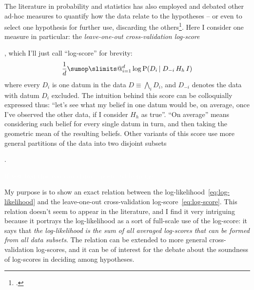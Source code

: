 \documentclass[\ifafour a4paper,12pt,\else a5paper,10pt,\fi%
onecolumn,oneside,article,%
british%
]{memoir}
\makeatletter
\theoremstyle{remark}
\theoremstyle{innote}
\def\sum{\DOTSI\sumop\slimits@}
\newcommand*{\citep}{\footcites}
\newcommand*{\Land}{\bigwedge}
\newcommand*{\p}{\mathrm{P}}%
\renewcommand*{\|}[1][]{\nonscript\,#1\vert\nonscript\;\mathopen{}}
\newcommand*{\sects}{\S\S}%
\newcommand*{\eqn}{eq.}%
\newcommand*{\yK}{I}
\makeatother
\begin{document}
\bigskip

The literature in probability and statistics has also employed and debated
other ad-hoc measures to quantify how the data relate to the hypotheses --
or even to select one hypothesis for further use, discarding the
others\citep[\sects~3.4, 6.1.6 gives the clearest motivation and
explanation]{bernardoetal1994_r2000}[see
also][]{stone1977,geisseretal1979,vehtarietal2012,vehtarietal2002,krnjajicetal2011,krnjajicetal2014,gelmanetal2014,gronauetal2019,chandramoulietal2019}.
Here I consider one measure in particular: the \emph{leave-one-out
  cross-validation log-score}\addtocounter{footnote}{-1}\footnotemark{},
which I'll just call \enquote{log-score} for brevity:
\begin{equation}
  \label{eq:log-score}
  \frac{1}{d} \sum_{i=1}^{d} \log\p(D_{i} \| D_{-i} \, H_{h} \, \yK)
\end{equation}
where every $D_{i}$ is one datum in the data $D \equiv \Land_{i} D_{i}$,
and $D_{-i}$ denotes the data with datum $D_{i}$ excluded. The intuition
behind this score can be colloquially expressed thus: \enquote{let's see
  what my belief in one datum would be, on average, once I've observed the
  other data, if I consider $H_{h}$ as true}. \enquote{On average} means
considering such belief for every single datum in turn, and then taking the
geometric mean of the resulting
beliefs. %
Other variants of this score use more general partitions of the data into
two disjoint subsets\addtocounter{footnote}{-1}\footnotemark{}.

\textcolor{white}{If you find this you can claim a postcard from me.}


My purpose is to show an exact relation between the
log-likelihood~\eqref{eq:log-likelihood} and the leave-one-out
cross-validation log-score~\eqref{eq:log-score}. This relation doesn't seem
to appear in the literature, and I find it very intriguing because it
portrays the log-likelihood as a sort of full-scale use of the log-score:
it says that \emph{the log-likelihood is the sum of all averaged log-scores
  that can be formed from all data subsets}. The relation can be extended
to more general cross-validation log-scores, and it can be of interest for
the debate about the soundness of log-scores in deciding among hypotheses.




\end{document}
